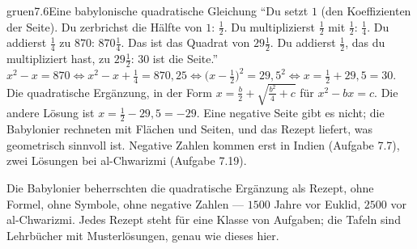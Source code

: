 \begin{loesungkarte}{gruen}{7.6}{Eine babylonische quadratische Gleichung}
\enquote{Du setzt $1$ (den Koeffizienten der Seite). Du zerbrichst die Hälfte von $1$: $\frac12$. Du multiplizierst $\frac12$ mit $\frac12$: $\frac14$. Du addierst $\frac14$ zu $870$: $870\frac14$. Das ist das Quadrat von $29\frac12$. Du addierst $\frac12$, das du multipliziert hast, zu $29\frac12$: $30$ ist die Seite.}
$x^{2} - x = 870\iff x^{2} - x + \frac14 = 870{,}25\iff\bigl(x - \frac12\bigr)^{2} = 29{,}5^{2}\iff x = \frac12 + 29{,}5 = 30$. Die quadratische Ergänzung, in der Form $x = \frac b2 + \sqrt{\frac{b^{2}}4 + c}$ für $x^{2} - bx = c$.
Die andere Lösung ist $x = \frac12 - 29{,}5 = -29$. Eine negative Seite gibt es nicht; die Babylonier rechneten mit Flächen und Seiten, und das Rezept liefert, was geometrisch sinnvoll ist. Negative Zahlen kommen erst in Indien (Aufgabe 7.7), zwei Lösungen bei al-Chwarizmi (Aufgabe 7.19).
\begin{mitnehmen}\kastentext
Die Babylonier beherrschten die quadratische Ergänzung als Rezept, ohne Formel, ohne Symbole, ohne negative Zahlen --- $1500$ Jahre vor Euklid, $2500$ vor al-Chwarizmi. Jedes Rezept steht für eine Klasse von Aufgaben; die Tafeln sind Lehrbücher mit Musterlösungen, genau wie dieses hier.
\end{mitnehmen}
\end{loesungkarte}


